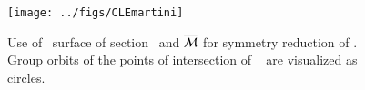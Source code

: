\begin{figure}[ht]
\begin{center}
  \texttt{[image: ../figs/CLEmartini]}
\end{center}
\caption{
Use of \Poincare\ surface of section \PoincS\ and {\slice}
$\overline{\cal M}$ for symmetry reduction of \cLf. Group orbits of the
points of intersection of \rpo\  are visualized as
circles.
    }
\label{fig:CLEmartini}
\end{figure}
